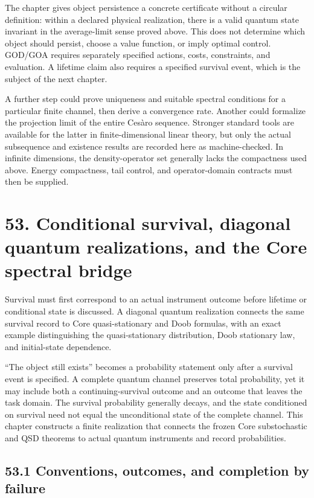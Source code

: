\documentclass[
  11pt,
  oneside]{book}
\begin{document}
The chapter gives object persistence a concrete certificate without a
circular definition: within a declared physical realization, there is a
valid quantum state invariant in the average-limit sense proved above.
This does not determine which object should persist, choose a value
function, or imply optimal control. GOD/GOA requires separately
specified actions, costs, constraints, and evaluation. A lifetime claim
also requires a specified survival event, which is the subject of the
next chapter.

A further step could prove uniqueness and suitable spectral conditions
for a particular finite channel, then derive a convergence rate. Another
could formalize the projection limit of the entire Cesàro sequence.
Stronger standard tools are available for the latter in
finite-dimensional linear theory, but only the actual subsequence and
existence results are recorded here as machine-checked. In infinite
dimensions, the density-operator set generally lacks the compactness
used above. Energy compactness, tail control, and operator-domain
contracts must then be supplied.

\chapter{53. Conditional survival, diagonal quantum realizations, and
the Core spectral bridge}\label{ch-53}

Survival must first correspond to an actual instrument outcome before
lifetime or conditional state is discussed. A diagonal quantum
realization connects the same survival record to Core quasi-stationary
and Doob formulas, with an exact example distinguishing the
quasi-stationary distribution, Doob stationary law, and initial-state
dependence.

``The object still exists'' becomes a probability statement only after a
survival event is specified. A complete quantum channel preserves total
probability, yet it may include both a continuing-survival outcome and
an outcome that leaves the task domain. The survival probability
generally decays, and the state conditioned on survival need not equal
the unconditional state of the complete channel. This chapter constructs
a finite realization that connects the frozen Core substochastic and QSD
theorems to actual quantum instruments and record probabilities.

\section{53.1 Conventions, outcomes, and completion by failure}
\end{document}
